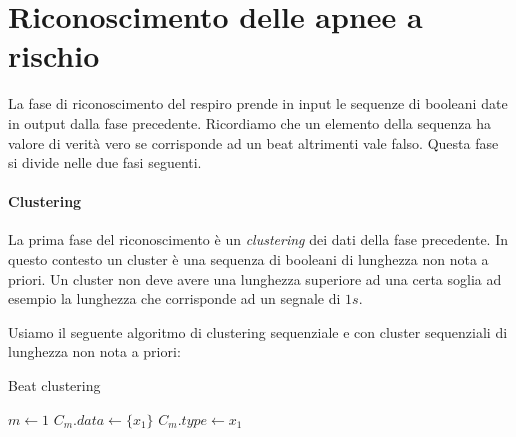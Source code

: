   \section{Riconoscimento delle apnee a rischio}
    La fase di riconoscimento del respiro prende in input le sequenze di booleani date in output dalla fase precedente. 
    Ricordiamo che un elemento della sequenza ha valore di verit\`a vero se corrisponde ad un beat altrimenti vale falso. 
    Questa fase si divide nelle due fasi seguenti.

\paragraph{Clustering}

La prima fase del riconoscimento \`e un \emph{clustering} dei dati della fase precedente. 
In questo contesto un cluster \`e una sequenza di booleani di lunghezza non nota a priori.
Un cluster non deve avere una lunghezza superiore ad una certa soglia ad esempio la lunghezza che corrisponde ad un segnale di $1s$.

Usiamo il seguente algoritmo di clustering sequenziale e con cluster sequenziali di lunghezza non nota a priori:
\incmargin{1em}
\linesnumbered
\begin{algorithm}
  \dontprintsemicolon
  \SetVline
  \caption{Beat clustering}
    \BlankLine
    $m\leftarrow 1$\;
    $C_{m}.data \leftarrow \{x_{1}\}$\;
    $C_{m}.type \leftarrow x_{1}$
\label{clusteringSequenzialeImplementazione}
\end{algorithm}
\decmargin{1em}


